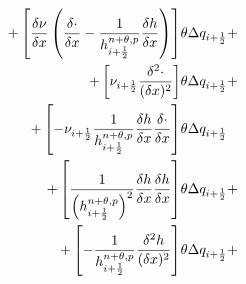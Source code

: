 \begin{align}
+ \left[
\frac{\delta\nu}{\delta x}  \left( \frac{\delta \cdot}{\delta x}
- \frac{1}{h^{n+\theta,p}_{i+\frac{1}{2}}} \frac{\delta h}{\delta x} \right)
\right] & \theta \Delta q_{i+\frac{1}{2}} +
\\
+ \left[
\nu_{i+\frac{1}{2}}\frac{\delta^2\cdot}{(\delta x)^2} \right] & \theta \Delta q_{i+\frac{1}{2}} +
\\
+ \left[
-\nu_{i+\frac{1}{2}} \frac{1}{h^{n+\theta,p}_{i+\frac{1}{2}}} \frac{\delta h}{\delta x} \frac{\delta \cdot}{\delta x} \right] & \theta \Delta q_{i+\frac{1}{2}}
\\
+ \left[
\frac{1}{\left(h^{n+\theta,p}_{i+\frac{1}{2}}\right)^2} \frac{\delta h}{\delta x} \frac{\delta h}{\delta x}
\right] & \theta \Delta q_{i+\frac{1}{2}}  +
\\
+ \left[
 - \frac{1}{h^{n+\theta,p}_{i+\frac{1}{2}}}
\frac{\delta^2 h}{(\delta x)^2}
\right] & \theta \Delta q_{i+\frac{1}{2}}  +
\end{align}

